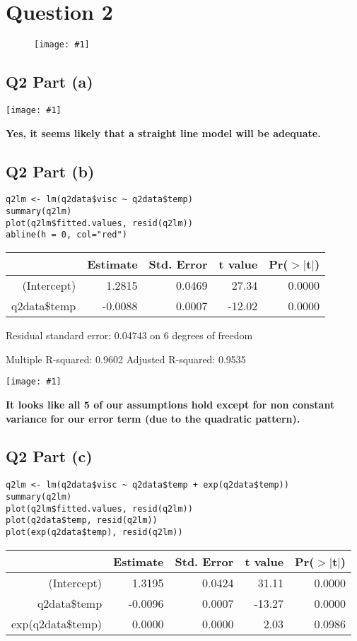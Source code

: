 \documentclass{article}
\newcommand\bsc[2][\DefaultOpt]{%
  \def\DefaultOpt{#2}%
  \section[#1]{#2}%
}
\newcommand\ssc[2][\DefaultOpt]{%
  \def\DefaultOpt{#2}%
  \subsection[#1]{#2}%
}
\newcommand{\simg}[1]{
  \texttt{[image: \#1]}
}
\newcommand{\wimg}[1]{
\begin{figure}[h]
  \texttt{[image: \#1]}
\end{figure}
}
\newcommand\tab[1][1cm]{\hspace*{#1}}
\begin{document}
\bsc{Question 2}{
\wimg{HW6Q2}
\ssc{Q2 Part (a)}{
\simg{HW6Q2ScPlt}

\textbf{Yes, it seems likely that a straight line model will be adequate.}
}
\ssc{Q2 Part (b)}{

\begin{verbatim}
q2lm <- lm(q2data$visc ~ q2data$temp)
summary(q2lm)
plot(q2lm$fitted.values, resid(q2lm))
abline(h = 0, col="red")
\end{verbatim}


\begin{table}[ht]
\centering
\begin{tabular}{rrrrr}
  \hline
 & Estimate & Std. Error & t value & Pr($>$$|$t$|$) \\ 
  \hline
(Intercept) & 1.2815 & 0.0469 & 27.34 & 0.0000 \\ 
  q2data\$temp & -0.0088 & 0.0007 & -12.02 & 0.0000 \\ 
   \hline
\end{tabular}
\end{table}

Residual standard error: 0.04743 on 6 degrees of freedom

Multiple R-squared:  0.9602 \tab Adjusted R-squared:  0.9535

\simg{HW6Q2PBPlt}

\textbf{It looks like all 5 of our assumptions hold except for non constant variance for our error term (due to the quadratic pattern).}
}

\newpage

\ssc{Q2 Part (c)}{

\begin{verbatim}
q2lm <- lm(q2data$visc ~ q2data$temp + exp(q2data$temp))
summary(q2lm)
plot(q2lm$fitted.values, resid(q2lm))
plot(q2data$temp, resid(q2lm))
plot(exp(q2data$temp), resid(q2lm))
\end{verbatim}

\begin{table}[ht]
\centering
\begin{tabular}{rrrrr}
  \hline
 & Estimate & Std. Error & t value & Pr($>$$|$t$|$) \\ 
  \hline
(Intercept) & 1.3195 & 0.0424 & 31.11 & 0.0000 \\ 
  q2data\$temp & -0.0096 & 0.0007 & -13.27 & 0.0000 \\ 
  exp(q2data\$temp) & 0.0000 & 0.0000 & 2.03 & 0.0986 \\ 
   \hline
\end{tabular}
\end{table}

}}
\end{document}
